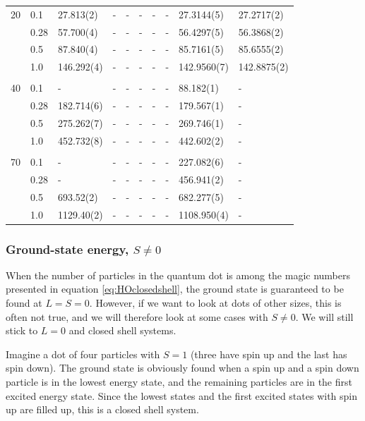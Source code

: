 {\begin{landscape}
\begin{table}
\begin{tabularx}{\hsize}{l:l|R{2.3cm}R{2.3cm}R{2.3cm}R{2.3cm}R{2.3cm}R{2.3cm}R{2.3cm}R{2.3cm}}
		20 & 0.1 & 27.813(2) & - & - & - & - & - & 27.3144(5) & 27.2717(2) \\ 
		& 0.28 & 57.700(4) & - & - & - & - & - & 56.4297(5) & 56.3868(2) \\
		& 0.5 & 87.840(4) & - & - & - & - & - & 85.7161(5) & 85.6555(2) \\
		& 1.0 & 146.292(4) & - & - & - & - & - & 142.9560(7) & 142.8875(2) \\ \hdashline \\
		
		40 & 0.1 & - & - & - & - & - & - & 88.182(1) & - \\ 
		& 0.28 & 182.714(6) & - & - & - & - & - & 179.567(1) & - \\
		& 0.5 & 275.262(7) & - & - & - & - & - & 269.746(1) & - \\
		& 1.0 & 452.732(8) & - & - & - & - & - & 442.602(2) & - \\ \hdashline \\
		
		70 & 0.1 & - & - & - & - & - & - & 227.082(6) & - \\ 
		& 0.28 & - & - & - & - & - & - & 456.941(2) & - \\
		& 0.5 & 693.52(2) & - & - & - & - & - & 682.277(5) & - \\
		& 1.0 & 1129.40(2) & - & - & - & - & - & 1108.950(4) & - \\ \hline\hline
	\end{tabularx}
\end{table}
\end{landscape}
}

\subsubsection{Ground-state energy, $S\neq0$}
When the number of particles in the quantum dot is among the magic numbers presented in equation \eqref{eq:HOclosedshell}, the ground state is guaranteed to be found at $L=S=0$. However, if we want to look at dots of other sizes, this is often not true, and we will therefore look at some cases with $S\neq 0$. We will still stick to $L=0$ and closed shell systems.

Imagine a dot of four particles with $S=1$ (three have spin up and the last has spin down). The ground state is obviously found when a spin up and a spin down particle is in the lowest energy state, and the remaining particles are in the first excited energy state. Since the lowest states and the first excited states with spin up are filled up, this is a closed shell system.


